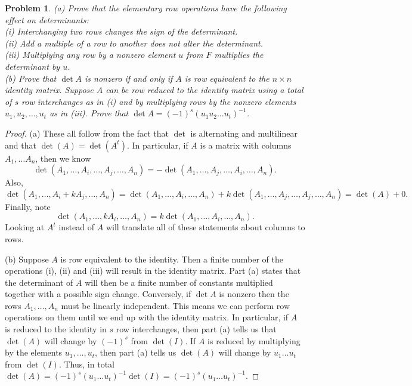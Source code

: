 \documentclass{article}
\newtheorem{problem}{Problem}
\begin{document}
\begin{problem}
(a) Prove that the elementary row operations have the following effect on determinants:\\
(i) Interchanging two rows changes the sign of the determinant.\\
(ii) Add a multiple of a row to another does not alter the determinant.\\
(iii) Multiplying any row by a nonzero element $u$ from $F$ multiplies the determinant by $u$.\\
(b) Prove that $\det A$ is nonzero if and only if $A$ is row equivalent to the $n \times n$ identity matrix. Suppose $A$ can be row reduced to the identity matrix using a total of $s$ row interchanges as in (i) and by multiplying rows by the nonzero elements $u_1, u_2, \dots , u_t$ as in (iii). Prove that $\det A = (-1)^s(u_1u_2 \dots u_t)^{-1}$.
\end{problem}
\begin{proof}
(a) These all follow from the fact that $\det$ is alternating and multilinear and that $\det(A) = \det(A^t)$. In particular, if $A$ is a matrix with columns $A_1, \dots A_n$, then we know
\[
\det(A_1, \dots , A_i, \dots , A_j, \dots , A_n) = -\det(A_1, \dots , A_j, \dots , A_i, \dots , A_n).
\]
Also,
\[
\det(A_1, \dots , A_i + kA_j, \dots , A_n) = \det(A_1, \dots , A_i, \dots , A_n) + k\det(A_1, \dots , A_j, \dots , A_j, \dots , A_n) = \det(A) + 0.
\]
Finally, note
\[
\det(A_1, \dots , kA_i, \dots , A_n) = k \det(A_1, \dots , A_i, \dots , A_n).
\]
Looking at $A^t$ instead of $A$ will translate all of these statements about columns to rows.

(b) Suppose $A$ is row equivalent to the identity. Then a finite number of the operations (i), (ii) and (iii) will result in the identity matrix. Part (a) states that the determinant of $A$ will then be a finite number of constants multiplied together with a possible sign change. Conversely, if $\det A$ is nonzero then the rows $A_1, \dots , A_n$ must be linearly independent. This means we can perform row operations on them until we end up with the identity matrix. In particular, if $A$ is reduced to the identity in $s$ row interchanges, then part (a) tells us that $\det(A)$ will change by $(-1)^s$ from $\det(I)$. If $A$ is reduced by multiplying by the elements $u_1, \dots , u_t$, then part (a) tells us $\det(A)$ will change by $u_1 \dots u_t$ from $\det(I)$. Thus, in total $\det(A) = (-1)^s(u_1 \dots u_t)^{-1} \det(I) = (-1)^s(u_1 \dots u_t)^{-1}$.
\end{proof}
\end{document}
